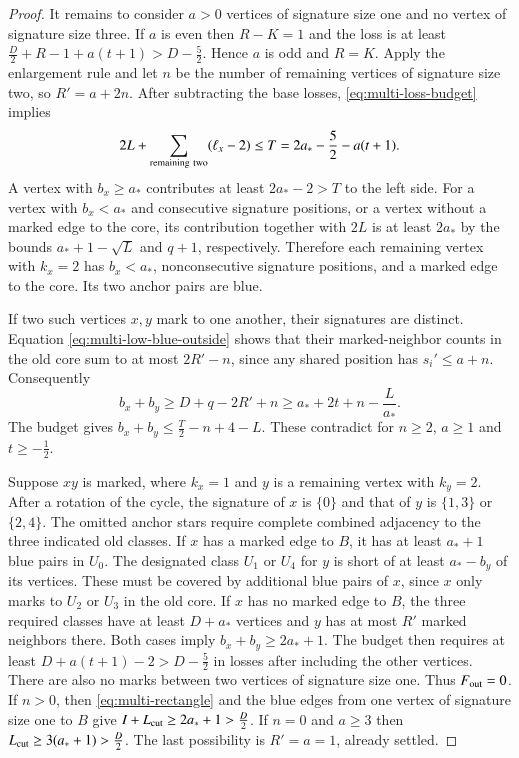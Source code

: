 \documentclass[preprint,11pt,numbers]{elsarticle-arxiv}
\numberwithin{equation}{section}
\theoremstyle{definition}
\begin{document}
\begin{proof}
It remains to consider $a>0$ vertices of signature size one and no
vertex of signature size three. If $a$ is even then $R-K=1$ and the loss
is at least $\frac{D}{2}+R-1+a(t+1)>D-\frac{5}{2}$. Hence $a$ is odd and $R=K$.
Apply the enlargement rule and let $n$ be the number of remaining
vertices of signature size two, so $R'=a+2n$. After subtracting the base
losses, \eqref{eq:multi-loss-budget} implies
\[
 2L+\sum_{\rm remaining\ two}(\ell_x-2)
 \le T=2a_*-\frac{5}{2}-a(t+1).
\]
A vertex with $b_x\ge a_*$ contributes at least $2a_*-2>T$ to the
left side. For a vertex with $b_x<a_*$ and consecutive signature
positions, or a vertex without a marked edge to the core, its
contribution together with $2L$ is at least $2a_*$ by the bounds
$a_*+1-\sqrt L$ and $q+1$, respectively. Therefore each remaining
vertex with $k_x=2$ has $b_x<a_*$, nonconsecutive signature positions,
and a marked edge to the core. Its two anchor pairs are blue.

If two such vertices $x,y$ mark to one another, their signatures
are distinct. Equation \eqref{eq:multi-low-blue-outside} shows that
their marked-neighbor counts in the old core sum to at most
$2R'-n$, since any shared position has $s_i'\le a+n$.
Consequently
\[
 b_x+b_y\ge D+q-2R'+n\ge a_*+2t+n-\frac{L}{a_*}.
\]
The budget gives $b_x+b_y\le \frac{T}{2}-n+4-L$. These contradict for
$n\ge2$, $a\ge1$ and $t\ge-\frac{1}{2}$.

Suppose $xy$ is marked, where $k_x=1$ and $y$ is a remaining
vertex with $k_y=2$. After a rotation of the cycle, the signature
of $x$ is $\{0\}$ and that of $y$ is $\{1,3\}$ or $\{2,4\}$. The omitted anchor stars require
complete combined adjacency to the three indicated old classes.
If $x$ has a marked edge to $B$, it has at least $a_*+1$ blue pairs
in $U_0$. The designated class $U_1$ or $U_4$ for $y$ is short of
at least $a_*-b_y$ of its vertices. These must be covered by
additional blue pairs of $x$, since $x$ only marks to $U_2$ or
$U_3$ in the old core. If $x$ has no marked edge to $B$, the
three required classes have at least $D+a_*$ vertices and $y$
has at most $R'$ marked neighbors there. Both cases imply
$b_x+b_y\ge2a_*+1$. The budget then requires at least
$D+a(t+1)-2>D-\frac{5}{2}$ in losses after including the other vertices.
There are also no marks between two vertices of signature size one.
Thus $F_{\rm out}=0$. If $n>0$, then \eqref{eq:multi-rectangle} and the blue edges
from one vertex of signature size one to $B$ give $I+L_{\rm cut}\ge2a_*+1>\frac{D}{2}$.
If $n=0$ and $a\ge3$ then $L_{\rm cut}\ge3(a_*+1)>\frac{D}{2}$.
The last possibility is $R'=a=1$, already settled.


\end{proof}
\end{document}
